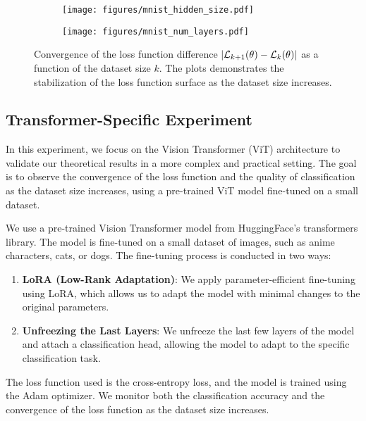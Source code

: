 \documentclass{article}
\begin{document}
\begin{figure}[h]
\centering
\begin{subfigure}[b]{0.48\linewidth}
    \texttt{[image: figures/mnist\_hidden\_size.pdf]}
    \caption{}
    \label{fig:base_mnist_hidden_size}
\end{subfigure}
\hfill
\begin{subfigure}[b]{0.48\linewidth}
    \texttt{[image: figures/mnist\_num\_layers.pdf]}
    \caption{}
    \label{fig:base_mnist_num_layers}
\end{subfigure}
\caption{Convergence of the loss function difference 
$|\mathcal{L}_{k + 1}(\theta) - \mathcal{L}_{k}(\theta)|$ as a function of the dataset size $k$. 
The plots demonstrates the stabilization of the loss function surface as the dataset size increases.}
\label{fig:base_experiment}
\end{figure}
\subsection{Transformer-Specific Experiment}

In this experiment, we focus on the Vision Transformer (ViT) architecture to validate our theoretical results in a more complex and practical setting. The goal is to observe the convergence of the loss function and the quality of classification as the dataset size increases, using a pre-trained ViT model fine-tuned on a small dataset.

We use a pre-trained Vision Transformer model from HuggingFace's transformers library. The model is fine-tuned on a small dataset of images, such as anime characters, cats, or dogs. The fine-tuning process is conducted in two ways:
\begin{enumerate}
\item \textbf{LoRA (Low-Rank Adaptation)}: We apply parameter-efficient fine-tuning using LoRA, which allows us to adapt the model with minimal changes to the original parameters.
\item \textbf{Unfreezing the Last Layers}: We unfreeze the last few layers of the model and attach a classification head, allowing the model to adapt to the specific classification task.
\end{enumerate}

The loss function used is the cross-entropy loss, and the model is trained using the Adam optimizer. We monitor both the classification accuracy and the convergence of the loss function as the dataset size increases.
\end{document}
